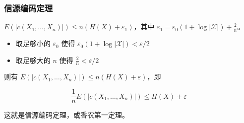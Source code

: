 \documentclass{beamer}
\begin{document}
\begin{frame}
    \frametitle{信源编码定理}

    $E(\lvert c(X_1, \dots, X_n)\rvert) \leq n(H(X) + \varepsilon_1)$，其中 $\varepsilon_1 = \varepsilon_0(1 + \log\lvert\mathcal{X}\rvert) + \frac{2}{n}$。
    
    \begin{itemize}
        \item 取足够小的 $\varepsilon_0$ 使得 $\varepsilon_0(1 + \log\lvert\mathcal{X}\rvert) < \varepsilon / 2$
        \item 取足够大的 $n$ 使得 $\frac{2}{n} < \varepsilon / 2$
    \end{itemize}

    则有 $E(\lvert c(X_1, \dots, X_n)\rvert) \leq n(H(X) + \varepsilon)$，即

    \[\frac{1}{n}E(\lvert c(X_1, \dots, X_n)\rvert) \leq H(X) + \varepsilon\]

    这就是信源编码定理，或香农第一定理。

\end{frame}
\end{document}
